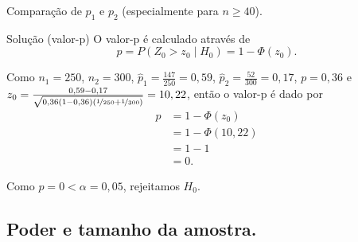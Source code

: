 \documentclass[9pt]{beamer}
\begin{document}
\begin{frame}{Comparação de $p_1$ e $p_2$ (especialmente para $n 
	\geq 40$).}

\begin{block}{Solução (valor-p)}
	O valor-p é calculado através de 
	$$p = P \left( Z_0 > z_0 \mid H_0 \right) = 1 - \Phi \left( z_0 \right).$$
	
	Como $n_1=250$, $n_2=300$, $\hat{p}_1 = \frac{147}{250} = 0,59$, $\hat{p}_2 = \frac{52}{300} = 0,17$, $p = 0,36$ e $z_0 = \frac{0,59 - 0,17}{\sqrt{0,36(1 - 0,36) \left( \nicefrac{1}{250} + \nicefrac{1}{300} \right)}} = 10,22$, então o valor-p é dado por
	\begin{align*}
		p &= 1 - \Phi\left(z_0\right)\\
		&= 1 - \Phi\left(10,22\right)\\
		& = 1 -1\\
		&= 0.
	\end{align*}
	
	Como $p = 0 < \alpha = 0,05$, rejeitamos $H_0$.
\end{block}

\end{frame}


\subsection{Poder e tamanho da amostra.}
\end{document}
